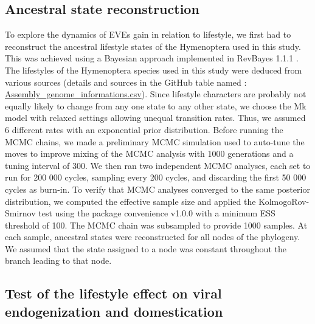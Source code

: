 \subsection{Ancestral state reconstruction}
\label{sec:MM-11}
To explore the dynamics of EVEs gain in relation to lifestyle, we first had to reconstruct the ancestral lifestyle states of the Hymenoptera used in this study. This was achieved using a Bayesian approach implemented in RevBayes 1.1.1 \citep{hohna_probabilistic_2014}. The lifestyles of the Hymenoptera species used in this study were deduced from various sources (details and sources in the GitHub table named : \href{https://github.com/BenjaminGuinet/PhD_defense/blob/main/Supplementary_paper1/Assembly_genome_informations.csv}{Assembly\_genome\_informations.csv}). Since lifestyle characters are probably not equally likely to change from any one state to any other state, we choose the Mk model with relaxed settings allowing unequal transition rates. Thus, we assumed 6 different rates with an exponential prior distribution. Before running the MCMC chains, we made a preliminary MCMC simulation used to auto-tune the moves to improve mixing of the MCMC analysis with 1000 generations and a tuning interval of 300. We then ran two independent MCMC analyses, each set to run for 200 000 cycles, sampling every 200 cycles, and discarding the first 50 000 cycles as burn-in. To verify that MCMC analyses converged to the same posterior distribution, we computed the effective sample size and applied the KolmogoRov-Smirnov test using the package convenience v1.0.0 with a minimum ESS threshold of 100.  The MCMC chain was subsampled to provide 1000 samples. At each sample, ancestral states were reconstructed for all nodes of the phylogeny. We assumed that the state assigned to a node was constant throughout the branch leading to that node.

\subsection{Test of the lifestyle effect on viral endogenization and domestication}
\label{sec:MM-12}

